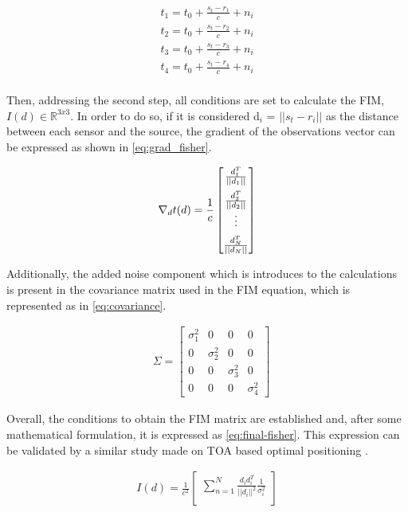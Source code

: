 \begin{eqnarray}
t_1 = t_0 + \frac{s_t - r_1}{c} + n_i \\
t_2 = t_0 + \frac{s_t - r_2}{c} + n_i \\
t_3 = t_0 + \frac{s_t - r_3}{c} + n_i \\
t_4 = t_0 + \frac{s_t - r_4}{c} + n_i \\
\label{eq:obs-my}
\end{eqnarray}

Then, addressing the second step, all conditions are set to calculate the FIM,  $I(d) \in \mathbb{R}^{3x3}$. In order to do so, if it is considered d$_{i}$ = $|| s_{t} - r_{i} ||$ as the distance between each sensor and the source, the gradient of the observations vector can be expressed as shown in \ref{eq:grad_fisher}.

\begin{eqnarray}
\nabla_{d}t(d) = \frac{1}{c} 
\begin{bmatrix}
\frac{d_1^T}{||d_1||} \\ 
\addlinespace
\frac{d_2^T}{||d_2||} \\
\vdots \\
\addlinespace
\frac{d_N^T}{||d_N||}
\end{bmatrix}
\label{eq:grad_fisher}
\end{eqnarray}

Additionally, the added noise component which is introduces to the calculations is present in the covariance matrix used in the FIM equation, which is represented as in \ref{eq:covariance}.

\begin{eqnarray}
& \Sigma = 
\begin{bmatrix}
\sigma_1^2 & 0 & 0 & 0 \\
0 & \sigma_2^2 & 0 & 0 \\
0 & 0  & \sigma_3^2  & 0 \\
0 & 0 & 0 & \sigma_4^2 
\end{bmatrix}
\label{eq:covariance}
\end{eqnarray}

Overall, the conditions to obtain the FIM matrix are established and, after some mathematical formulation, it is expressed as \ref{eq:final-fisher}. This expression can be validated by a similar study made on TOA based optimal positioning \cite{cramer-bruno}.

\begin{eqnarray}
I(d) = \frac{1}{c^2} 
\begin{bmatrix}
\sum_{n=1}^{N} \frac{d_i d_i^T}{||d_i||^2} \frac{1}{\sigma_i^2}\\
\end{bmatrix}
\label{eq:final-fisher}
\end{eqnarray}


